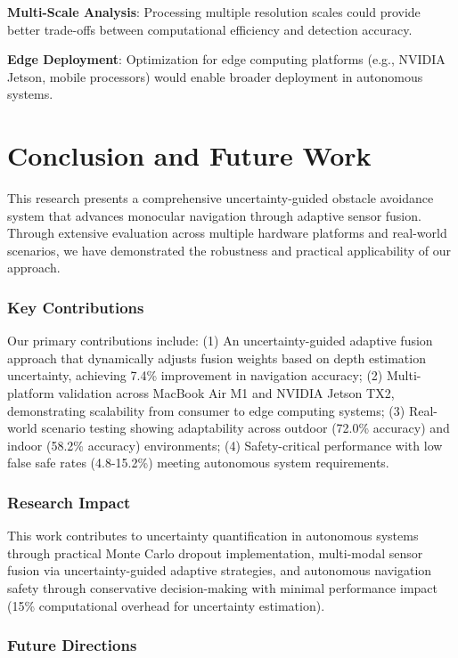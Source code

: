 \documentclass[12pt,oneside]{book}
\begin{document}
\textbf{Multi-Scale Analysis}: Processing multiple resolution scales could provide better trade-offs between computational efficiency and detection accuracy.

\textbf{Edge Deployment}: Optimization for edge computing platforms (e.g., NVIDIA Jetson, mobile processors) would enable broader deployment in autonomous systems.

\chapter{Conclusion and Future Work}

This research presents a comprehensive uncertainty-guided obstacle avoidance system that advances monocular navigation through adaptive sensor fusion. Through extensive evaluation across multiple hardware platforms and real-world scenarios, we have demonstrated the robustness and practical applicability of our approach.

\subsection{Key Contributions}

Our primary contributions include: (1) An uncertainty-guided adaptive fusion approach that dynamically adjusts fusion weights based on depth estimation uncertainty, achieving 7.4\% improvement in navigation accuracy; (2) Multi-platform validation across MacBook Air M1 and NVIDIA Jetson TX2, demonstrating scalability from consumer to edge computing systems; (3) Real-world scenario testing showing adaptability across outdoor (72.0\% accuracy) and indoor (58.2\% accuracy) environments; (4) Safety-critical performance with low false safe rates (4.8-15.2\%) meeting autonomous system requirements.

\subsection{Research Impact}

This work contributes to uncertainty quantification in autonomous systems through practical Monte Carlo dropout implementation, multi-modal sensor fusion via uncertainty-guided adaptive strategies, and autonomous navigation safety through conservative decision-making with minimal performance impact (15\% computational overhead for uncertainty estimation).

\subsection{Future Directions}
\end{document}
